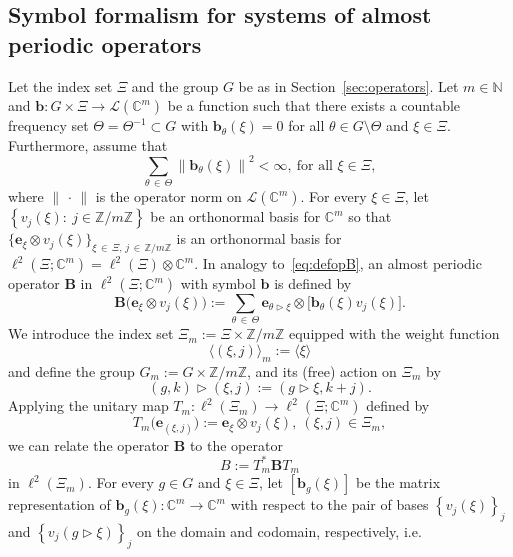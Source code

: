 \documentclass[AHL,Unicode,longabstracts,published]{cedram}
\newcommand{\C}{\mathbb C}
\newcommand{\N}{\mathbb N}
\newcommand{\Z}{\mathbb Z}
\newcommand{\CL}{\mathcal{L}}
\newcommand{\bb}{\mathbf b}
\newcommand{\BB}{\mathbf B}
\newcommand{\bbb}{\mathbf b}
\newcommand{\be}{\mathbf e}
\newcommand{\act}{\triangleright}
\renewcommand{\subseteq}{\subset}
\newcommand{\set}[1]{\left\{ #1 \right\}}
\newcommand{\ang}[1]{\langle #1 \rangle}
\begin{document}
\subsection{Symbol formalism for systems of almost periodic operators}
Let the index set $\Xi$ and the group $G$ be as in Section~\ref{sec:operators}. Let $m\in\N$ and $\bbb:G\times\Xi\to\CL(\C^m)$ be a function such that there exists a countable frequency set $\Theta=\Theta^{-1}\subseteq G$ with $\bbb_\theta(\xi)=0$ for all $\theta\in G\setminus \Theta$ and $\xi\in\Xi$. Furthermore, assume that
\begin{equation}
\sum\limits_{\theta\,\in\,\Theta}\left\|\bbb_\theta(\xi)\right\|^2 <\infty,\ \text{for all } \xi\in\Xi,
\end{equation}
where $\|\,\cdot\,\|$ is the operator norm on $\CL(\C^m)$. For every $\xi\in\Xi$, let $\set{v_j(\xi):\ j\in \Z/m\Z}$ be an orthonormal basis for $\C^m$ so that $\lbrace\be_\xi\otimes v_j(\xi)\rbrace_{\xi\,\in\,\Xi,\,j\,\in\,\Z/m\Z}$ is an orthonormal basis for $\ell^2(\Xi;\C^m)=\ell^2(\Xi)\otimes\C^m$. In analogy to~\eqref{eq:defopB}, an almost periodic operator $\BB$ in $\ell^2(\Xi;\C^m)$ with symbol $\bb$ is defined by
\begin{equation}\label{eq:Basmatrixop}
\BB\big(\be_\xi \otimes v_j(\xi)\big):=\sum_{\theta\,\in\,\Theta}\be_{\theta\act\xi} \otimes \big[\bbb_{\theta}(\xi)v_j(\xi)\big].
\end{equation}
We introduce the index set $\Xi_m := \Xi \times \Z/m\Z$ equipped with the weight function
\begin{equation}\label{eq:angxim}
\ang{(\xi,j)}_m:= \ang \xi
\end{equation}
and define the group $G_m:= G \times \Z/m\Z$, and its (free) action on $\Xi_m$ by
\begin{equation}\label{eq:actiongprime}
(g,k)\act(\xi,j):= (g\act \xi,k+j).
\end{equation}
Applying the unitary map $T_m:\ell^2(\Xi_m)\to\ell^2(\Xi;\C^m)$ defined by
\begin{equation}\label{eq:defTm}
T_m\big(\be_{(\xi,j)}\big):= \be_\xi\otimes v_j(\xi),\ (\xi,j)\in \Xi_m,
\end{equation}
we can relate the operator $\BB$ to the operator
\begin{equation}\label{eq:defBfromBB}
B:=T_m^\ast \BB T_m
\end{equation}
in $\ell^2(\Xi_m)$. For every $g\in G$ and $\xi\in\Xi$, let $[\bbb_g(\xi)]$ be the matrix representation of $\bbb_g(\xi):\C^m\to\C^m$ with respect to the pair of bases $\set{v_j(\xi)}_j$ and $\set{v_j(g\act \xi)}_j$ on the domain and codomain, respectively, i.e.
\end{document}
